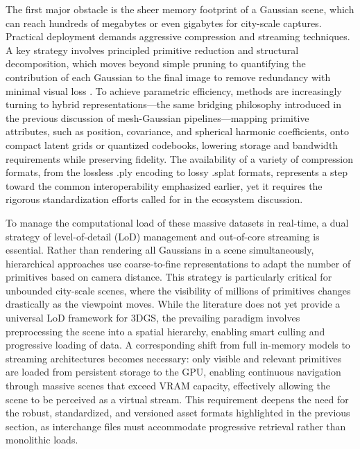 \documentclass[11pt,a4paper]{article}
\begin{document}
The first major obstacle is the sheer memory footprint of a Gaussian scene, which can reach hundreds of megabytes or even gigabytes for city-scale captures. Practical deployment demands aggressive compression and streaming techniques. A key strategy involves principled primitive reduction and structural decomposition, which moves beyond simple pruning to quantifying the contribution of each Gaussian to the final image to remove redundancy with minimal visual loss \cite{arxiv:2605.14880v1,arxiv:2504.00773v1}. To achieve parametric efficiency, methods are increasingly turning to hybrid representations---the same bridging philosophy introduced in the previous discussion of mesh-Gaussian pipelines---mapping primitive attributes, such as position, covariance, and spherical harmonic coefficients, onto compact latent grids or quantized codebooks, lowering storage and bandwidth requirements while preserving fidelity. The availability of a variety of compression formats, from the lossless .ply encoding to lossy .splat formats, represents a step toward the common interoperability emphasized earlier, yet it requires the rigorous standardization efforts called for in the ecosystem discussion.

To manage the computational load of these massive datasets in real-time, a dual strategy of level-of-detail (LoD) management and out-of-core streaming is essential. Rather than rendering all Gaussians in a scene simultaneously, hierarchical approaches use coarse-to-fine representations to adapt the number of primitives based on camera distance. This strategy is particularly critical for unbounded city-scale scenes, where the visibility of millions of primitives changes drastically as the viewpoint moves. While the literature does not yet provide a universal LoD framework for 3DGS, the prevailing paradigm involves preprocessing the scene into a spatial hierarchy, enabling smart culling and progressive loading of data. A corresponding shift from full in-memory models to streaming architectures becomes necessary: only visible and relevant primitives are loaded from persistent storage to the GPU, enabling continuous navigation through massive scenes that exceed VRAM capacity, effectively allowing the scene to be perceived as a virtual stream. This requirement deepens the need for the robust, standardized, and versioned asset formats highlighted in the previous section, as interchange files must accommodate progressive retrieval rather than monolithic loads.
\end{document}
